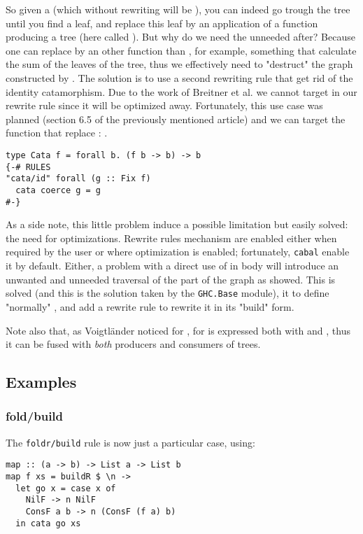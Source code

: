 So given a  (which without rewriting will be ), you can indeed go trough the tree until you find a leaf, and replace this leaf by an application of a function producing a tree (here called ). But why do we need the unneeded  after? Because one can replace  by an other function than , for example, something that calculate the sum of the leaves of the tree, thus we effectively need to "destruct" the graph constructed by . The solution is to use a second rewriting rule that get rid of the identity catamorphism. Due to the work of Breitner et al. \cite{Breitner:2014:SZC:2692915.2628141} we cannot target  in our rewrite rule since it will be optimized away. Fortunately, this use case was planned (section 6.5 of the previously mentioned article) and we can target the function that replace : .

\begin{verbatim}
type Cata f = forall b. (f b -> b) -> b
{-# RULES
"cata/id" forall (g :: Fix f)
  cata coerce g = g
#-}
\end{verbatim}

As a side note, this little problem induce a possible limitation but easily solved: the need for optimizations. Rewrite rules mechanism are enabled either when required by the user or where optimization is enabled; fortunately, \verb|cabal| enable it by default. Either, a problem with a direct use of  in  body will introduce an unwanted and unneeded traversal of the part of the graph as showed. This is solved (and this is the solution taken by the \verb|GHC.Base| module), it to define "normally" , and add a rewrite rule to rewrite it in its "build" form.

Note also that, as Voigtländer \cite{Voigtlnder2008TypesFP} noticed for ,  for  is expressed both with  and , thus it can be fused with \emph{both} producers and consumers of trees.

\subsection{Examples}
\subsubsection{fold/build}
The \verb|foldr/build| rule is now just a particular case, using:
\begin{verbatim}
map :: (a -> b) -> List a -> List b
map f xs = buildR $ \n ->
  let go x = case x of
    NilF -> n NilF
    ConsF a b -> n (ConsF (f a) b)
  in cata go xs
\end{verbatim}

